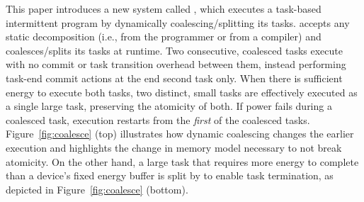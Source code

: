 
This paper introduces a new system called \sys, which executes a task-based
intermittent program by dynamically coalescing/splitting its tasks.
\sys accepts any static decomposition (i.e., from the programmer or from a compiler) 
and coalesces/splits its tasks at runtime. Two consecutive, coalesced tasks execute  
with no commit or task transition overhead between them, instead performing
task-end commit actions at the end second task only.
%
When there is sufficient energy to execute both tasks, two distinct, small
tasks are effectively executed as a single large task, preserving the atomicity
of both.  If power fails during a coalesced task, execution restarts from the
{\em first} of the coalesced tasks.  Figure~\ref{fig:coalesce} (top)
illustrates how dynamic coalescing changes the earlier execution and highlights
the change in memory model necessary to not break atomicity. On the other hand, a large task that requires more energy to complete than a device's fixed energy buffer is split by \sys to enable task termination, as depicted in Figure~\ref{fig:coalesce} (bottom).


